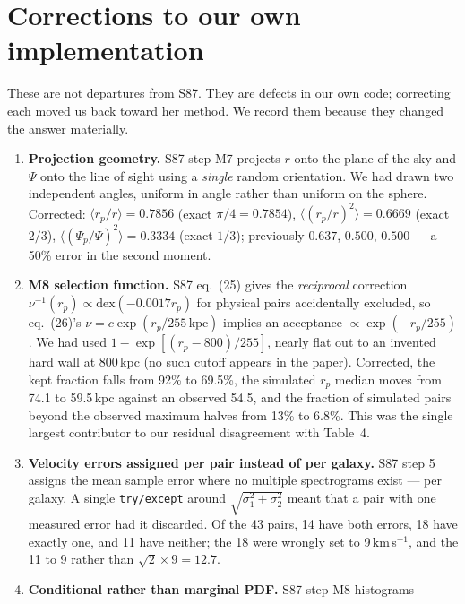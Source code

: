 \documentclass[11pt]{article}
\begin{document}
\section{Corrections to our own implementation}
\label{sec:corr}

These are not departures from S87. They are defects in our own code;
correcting each moved us back toward her method. We record them because they
changed the answer materially.

\begin{enumerate}\itemsep4pt
  \item \textbf{Projection geometry.} S87 step M7 projects $r$ onto the plane
        of the sky and $\Psi$ onto the line of sight using a \emph{single}
        random orientation. We had drawn two independent angles, uniform in
        angle rather than uniform on the sphere. Corrected:
        $\langle r_p/r \rangle = 0.7856$ (exact $\pi/4 = 0.7854$),
        $\langle (r_p/r)^2 \rangle = 0.6669$ (exact $2/3$),
        $\langle (\Psi_p/\Psi)^2 \rangle = 0.3334$ (exact $1/3$); previously
        $0.637$, $0.500$, $0.500$ --- a 50\% error in the second moment.
  \item \textbf{M8 selection function.} S87 eq.~(25) gives the
        \emph{reciprocal} correction $\nu^{-1}(r_p) \propto \mathrm{dex}(-0.0017 r_p)$
        for physical pairs accidentally excluded, so eq.~(26)'s
        $\nu = c\exp(r_p/255\,\mathrm{kpc})$ implies an acceptance
        $\propto \exp(-r_p/255)$. We had used
        $1 - \exp[(r_p-800)/255]$, nearly flat out to an invented hard wall at
        800\,kpc (no such cutoff appears in the paper). Corrected, the kept
        fraction falls from 92\% to 69.5\%, the simulated $r_p$ median moves
        from 74.1 to 59.5\,kpc against an observed 54.5, and the fraction of
        simulated pairs beyond the observed maximum halves from 13\% to 6.8\%.
        This was the single largest contributor to our residual disagreement
        with Table~4.
  \item \textbf{Velocity errors assigned per pair instead of per galaxy.} S87
        step 5 assigns the mean sample error where no multiple spectrograms
        exist --- per galaxy. A single \texttt{try/except} around
        $\sqrt{\sigma_1^2+\sigma_2^2}$ meant that a pair with one measured
        error had it discarded. Of the 43 pairs, 14 have both errors, 18 have
        exactly one, and 11 have neither; the 18 were wrongly set to
        9\,km\,s$^{-1}$, and the 11 to 9 rather than $\sqrt{2}\times9 = 12.7$.
  \item \textbf{Conditional rather than marginal PDF.} S87 step M8 histograms

\end{enumerate}
\end{document}
